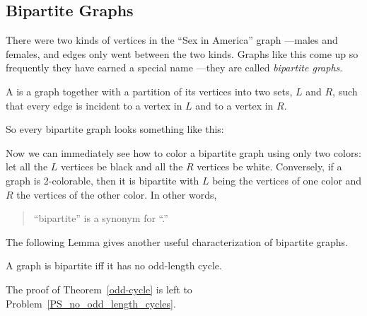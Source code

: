 \begin{problems}

\homeworkproblems
{}

\end{problems}

\label{bipartitesec}

\subsection{Bipartite Graphs}\label{bipartitesubsec}
There were two kinds of vertices in the ``Sex in America'' graph ---males
and females, and edges only went between the two kinds.  Graphs like this
come up so frequently they have earned a special name ---they are called
\emph{bipartite graphs}.

\begin{definition}
A  is a graph together with a partition of its
vertices into two sets, $L$ and $R$, such that every edge is incident to a
vertex in $L$ and to a vertex in $R$.
\end{definition}

So every bipartite graph looks something like this:


Now we can immediately see how to color a bipartite graph using only two
colors: let all the $L$ vertices be black and all the $R$ vertices be
white.  Conversely, if a graph is 2-colorable, then it is bipartite with
$L$ being the vertices of one color and $R$ the vertices of the other
color.  In other words,
\begin{quote}
``bipartite'' is a synonym for ``.''
\end{quote}
The following Lemma gives another useful characterization of bipartite
graphs.

{\begin{theorem}\label{odd-cycle}
A graph is bipartite iff it has no odd-length cycle.
\end{theorem}}
The proof of Theorem~\ref{odd-cycle} is left to
Problem~\ref{PS_no_odd_length_cycles}.

